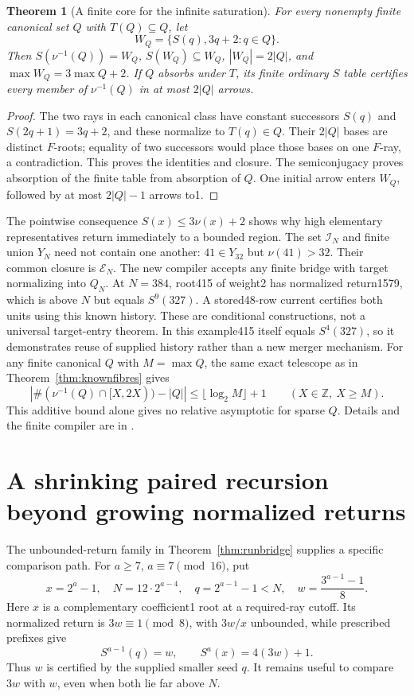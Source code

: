 \documentclass[11pt]{article}
\newtheorem{theorem}{Theorem}
\begin{document}
\begin{theorem}[A finite core for the infinite saturation]\label{thm:saturation}
For every nonempty finite canonical set $Q$ with $T(Q)\subseteq Q$, let
\[
W_Q=\{S(q),3q+2:q\in Q\}.
\]
Then $S(\nu^{-1}(Q))=W_Q$, $S(W_Q)\subseteq W_Q$,
$|W_Q|=2|Q|$, and $\max W_Q=3\max Q+2$.
If $Q$ absorbs under $T$, its finite ordinary $S$ table certifies every
member of $\nu^{-1}(Q)$ in at most $2|Q|$ arrows.
\end{theorem}
\begin{proof}
The two rays in each canonical class have constant successors $S(q)$
and $S(2q+1)=3q+2$, and these normalize to $T(q)\in Q$.
Their $2|Q|$ bases are distinct $F$-roots; equality of two successors
would place those bases on one $F$-ray, a contradiction.
This proves the identities and closure. The semiconjugacy proves absorption
of the finite table from absorption of $Q$. One initial arrow enters
$W_Q$, followed by at most $2|Q|-1$ arrows to1.
\end{proof}
The pointwise consequence $S(x)\le3\nu(x)+2$ shows why high elementary
representatives return immediately to a bounded region. The set
$\mathcal I_N$ and finite union $Y_N$ need not contain one another:
$41\in Y_{32}$ but $\nu(41)>32$. Their common closure is $\mathcal E_N$.
The new compiler accepts any finite bridge with target normalizing into
$Q_N$. At $N=384$, root415 of weight2 has normalized return1579,
which is above $N$ but equals $S^9(327)$. A stored48-row current certifies
both units using this known history. These are conditional constructions,
not a universal target-entry theorem.
In this example415 itself equals $S^4(327)$, so it demonstrates reuse of
supplied history rather than a new merger mechanism.
For any finite canonical $Q$ with $M=\max Q$, the same exact telescope
as in Theorem~\ref{thm:knownfibres} gives
\[
\left|\#(\nu^{-1}(Q)\cap[X,2X))-|Q|\right|
\le\lfloor\log_2 M\rfloor+1\qquad(X\in\mathbb Z,\ X\ge M).
\]
This additive bound alone gives no relative asymptotic for sparse $Q$.
Details and the finite compiler are in
.

\section{A shrinking paired recursion beyond growing normalized returns}
The unbounded-return family in Theorem~\ref{thm:runbridge} supplies a
specific comparison path. For $a\ge7$, $a\equiv7\pmod{16}$, put
\[
x=2^a-1,\quad N=12\cdot2^{a-4},\quad q=2^{a-1}-1<N,
\quad w=\frac{3^{a-1}-1}{8}.
\]
Here $x$ is a complementary coefficient1 root at a required-ray cutoff.
Its normalized return is $3w\equiv1\pmod8$, with $3w/x$ unbounded,
while prescribed prefixes give
\[
S^{a-1}(q)=w,\qquad S^a(x)=4(3w)+1.
\]
Thus $w$ is certified by the supplied smaller seed $q$. It remains useful
to compare $3w$ with $w$, even when both lie far above $N$.
\end{document}
